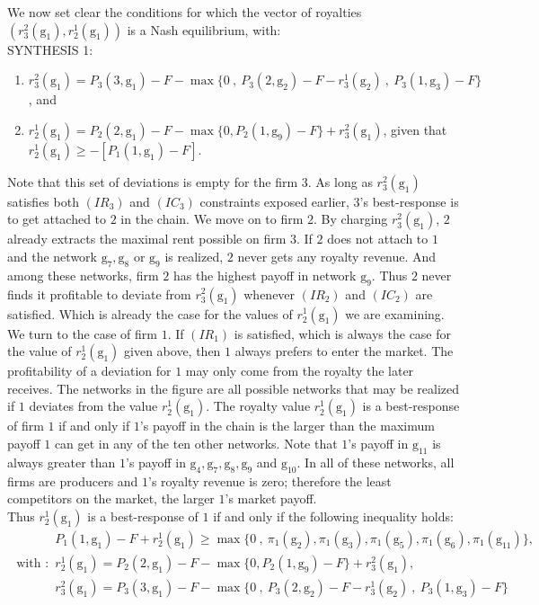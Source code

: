 \documentclass{article}
\begin{document}
We now set clear the conditions for which the vector of royalties $(r^2_3(\text{g}_1), r^1_2(\text{g}_1))$ is a Nash equilibrium, with: \\
\textsc{SYNTHESIS 1:}
\begin{enumerate}
    \item $r^2_3(\text{g}_1)= P_3(3,\text{g}_1)-F-\max\{0~,~P_3(2,\text{g}_2)-F -r^1_{3}(\text{g}_2) ~,~ P_3(1,\text{g}_3)-F \}$, and
    \item $r^1_2(\text{g}_1)= P_2(2,\text{g}_1)-F-\max\{0, P_2(1,\text{g}_9) -F\} + r^2_3(\text{g}_1)$, given that $r^1_2 (\text{g}_1)\geq -[P_1(1,\text{g}_1) -F]$. 
\end{enumerate}


Note that this set of deviations is empty for the firm $3$. As long as $r^2_3(\text{g}_1)$ satisfies both $(IR_3)$ and $(IC_3)$ constraints exposed earlier, $3$'s best-response is to get attached to $2$ in the chain. We move on to firm $2$. By charging $r^2_3(\text{g}_1)$, $2$ already extracts the maximal rent possible on firm $3$. If $2$ does not attach to $1$ and the network $\text{g}_7,\text{g}_8$ or $\text{g}_9$ is realized, $2$ never gets any royalty revenue. And among these networks, firm $2$ has the highest payoff in network $\text{g}_9$. Thus $2$ never finds it profitable to deviate from $r^2_3(\text{g}_1)$ whenever $(IR_2)$ and $(IC_2)$ are satisfied. Which is already the case for the values of $r^1_2(\text{g}_1)$ we are examining. \\
\indent We turn to the case of firm $1$. If $(IR_1)$ is satisfied, which is always the case for the value of $r^1_2(\text{g}_1)$ given above, then $1$ always prefers to enter the market. The profitability of a deviation for $1$ may only come from the royalty the later receives. The networks in the figure
are all possible networks that may be realized if $1$ deviates from the value $r^1_2(\text{g}_1)$. The royalty value $r^1_2(\text{g}_1)$ is a best-response of firm $1$ if and only if $1$'s payoff in the chain is the larger than the maximum payoff $1$ can get in any of the ten other networks. Note that $1$'s payoff in $\text{g}_{11}$ is always greater than $1$'s payoff in $\text{g}_4,\text{g}_7, \text{g}_8, \text{g}_9$ and $\text{g}_{10}$. In all of these networks, all firms are producers and $1$'s royalty revenue is zero; therefore the least competitors on the market, the larger $1$'s market payoff. \\
\indent Thus $r^1_2(\text{g}_1)$ is a best-response of $1$ if and only if the following inequality holds: \begin{align*}
  &  P_1(1,\text{g}_1)-F+r^1_2(\text{g}_1)\geq \max\{0~,~\pi_1(\text{g}_2),\pi_1(\text{g}_3), \pi_1(\text{g}_5), \pi_1(\text{g}_6), \pi_1(\text{g}_{11})\},\\
  \text{ with : } & r^1_2(\text{g}_1)= P_2(2,\text{g}_1)-F-\max\{0, P_2(1,\text{g}_9) -F\} + r^2_3(\text{g}_1),\\
  & r^2_3(\text{g}_1)= P_3(3,\text{g}_1)-F-\max\{0~,~P_3(2,\text{g}_2)-F -r^1_{3}(\text{g}_2) ~,~ P_3(1,\text{g}_3)-F \}
\end{align*}
\end{document}

